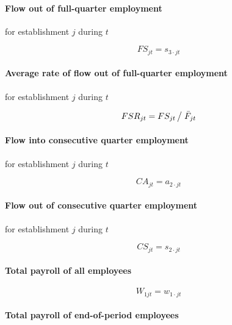 \paragraph{Flow out of full-quarter employment}

for establishment $j$ during $t$

\begin{equation}
FS_{jt} = s_{3\cdot jt}
\end{equation}

\paragraph{Average rate of flow out of full-quarter employment}

for establishment $j$ during $t$

\begin{equation}
FSR_{jt} = {FS_{jt} } \left/ {\vphantom {{FS_{jt} } {\bar {F}_{jt} }}}
\right. {\bar {F}_{jt} }
\end{equation}

\paragraph{Flow into consecutive quarter employment}

for establishment $j$ during $t$

\begin{equation}
CA_{jt} = a_{2\cdot jt}
\end{equation}

\paragraph{Flow out of consecutive quarter employment}

for establishment $j$ during $t$

\begin{equation}
CS_{jt} = s_{2\cdot jt}
\end{equation}

\paragraph{Total payroll of all employees}

\begin{equation}
W_{1jt} = w_{1\cdot jt}
\end{equation}

\paragraph{Total payroll of end-of-period employees}

